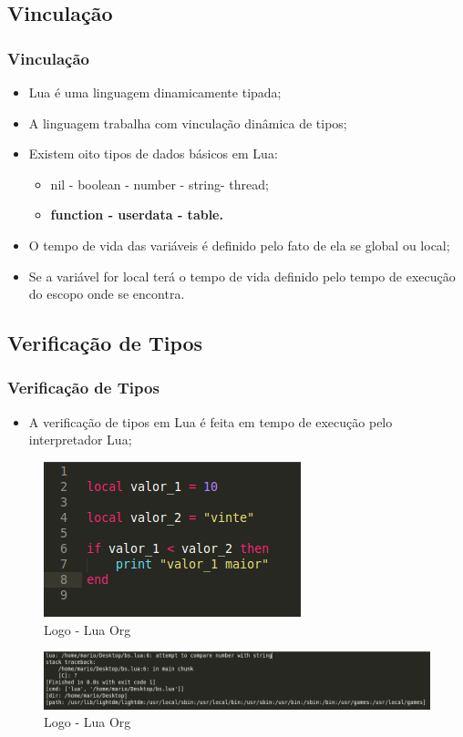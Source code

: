\documentclass{beamer}
\begin{document}
\subsection{Vinculação}
\begin{frame}[fragile]
\frametitle{Vinculação}
	\begin{itemize}
	\item<1-> Lua é uma linguagem dinamicamente tipada; 
	\item<2-> A linguagem trabalha com vinculação dinâmica de tipos;
	\item<3-> Existem oito tipos de dados básicos em Lua:
	\begin{itemize}
		\item<4-> nil - boolean - number - string- thread;
		\item<5-> \textbf{function - userdata - table.}
	\end{itemize}
	\item<6-> O tempo de vida das variáveis é definido pelo fato de ela se global ou local;
	\item<7-> Se a variável for local terá o tempo de vida definido pelo tempo de execução do escopo onde se encontra.
	\end{itemize}
\end{frame}

\subsection{Verificação de Tipos}
\begin{frame}[fragile]
\frametitle{Verificação de Tipos}
	\begin{itemize}
	\item A verificação de tipos em Lua é feita em tempo de execução pelo interpretador Lua;
	\end{itemize}
	\begin{figure}[!htb]
			\centering
			\includegraphics[width=0.3\linewidth]{imagens/verificacao_tipo2}
			\caption{Logo - Lua Org}
	\end{figure}

	\begin{figure}[!htb]
			\centering
			\includegraphics[width=1\linewidth]{imagens/verificacao_tipo}
			\caption{Logo - Lua Org}
	\end{figure}
\end{frame}
\end{document}
